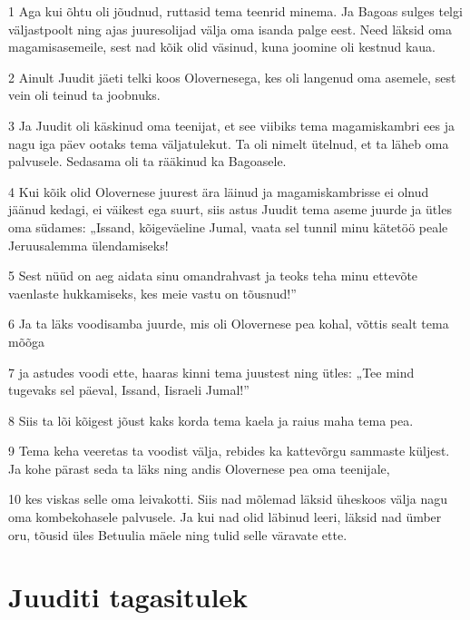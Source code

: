 \par 1 Aga kui õhtu oli jõudnud, ruttasid tema teenrid minema. Ja Bagoas sulges telgi väljastpoolt ning ajas juuresolijad välja oma isanda palge eest. Need läksid oma magamisasemeile, sest nad kõik olid väsinud, kuna joomine oli kestnud kaua.
\par 2 Ainult Juudit jäeti telki koos Olovernesega, kes oli langenud oma asemele, sest vein oli teinud ta joobnuks.
\par 3 Ja Juudit oli käskinud oma teenijat, et see viibiks tema magamiskambri ees ja nagu iga päev ootaks tema väljatulekut. Ta oli nimelt ütelnud, et ta läheb oma palvusele. Sedasama oli ta rääkinud ka Bagoasele.
\par 4 Kui kõik olid Olovernese juurest ära läinud ja magamiskambrisse ei olnud jäänud kedagi, ei väikest ega suurt, siis astus Juudit tema aseme juurde ja ütles oma südames: „Issand, kõigeväeline Jumal, vaata sel tunnil minu kätetöö peale Jeruusalemma ülendamiseks!
\par 5 Sest nüüd on aeg aidata sinu omandrahvast ja teoks teha minu ettevõte vaenlaste hukkamiseks, kes meie vastu on tõusnud!”
\par 6 Ja ta läks voodisamba juurde, mis oli Olovernese pea kohal, võttis sealt tema mõõga
\par 7 ja astudes voodi ette, haaras kinni tema juustest ning ütles: „Tee mind tugevaks sel päeval, Issand, Iisraeli Jumal!”
\par 8 Siis ta lõi kõigest jõust kaks korda tema kaela ja raius maha tema pea.
\par 9 Tema keha veeretas ta voodist välja, rebides ka kattevõrgu sammaste küljest. Ja kohe pärast seda ta läks ning andis Olovernese pea oma teenijale,
\par 10 kes viskas selle oma leivakotti. Siis nad mõlemad läksid üheskoos välja nagu oma kombekohasele palvusele. Ja kui nad olid läbinud leeri, läksid nad ümber oru, tõusid üles Betuulia mäele ning tulid selle väravate ette.

\section*{Juuditi tagasitulek}

